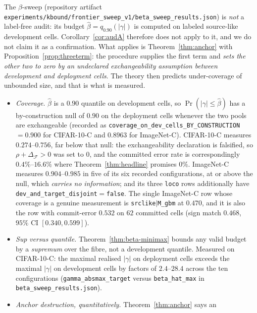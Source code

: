 \begin{remark}\label{rem:empirical}
The $\beta$-sweep (repository artifact
\texttt{experiments/kbound/frontier\_sweep\_v1/beta\_sweep\_results.json}) is \emph{not} a
label-free audit: its budget $\widehat\beta=q_{0.90}(|\gamma|)$ is computed on labeled
source-like development cells. Corollary~\ref{cor:audA} therefore does not apply to it, and
we do not claim it as a confirmation. What applies is Theorem~\ref{thm:anchor} with
Proposition~\ref{prop:threeterm}: the procedure supplies the first term and \emph{sets the
other two to zero by an undeclared exchangeability assumption between development and
deployment cells}. The theory then predicts under-coverage of unbounded size, and that is
what is measured.
\begin{itemize}
\item \emph{Coverage.} $\widehat\beta$ is a $0.90$ quantile on development cells, so
$\Pr(|\gamma|\le\widehat\beta)$ has a by-construction null of $0.90$ on the deployment cells
whenever the two pools are exchangeable (recorded as
\texttt{coverage\_on\_dev\_cells\_BY\_CONSTRUCTION} $=0.900$ for CIFAR-10-C and $0.8963$ for
ImageNet-C). CIFAR-10-C measures $0.274$--$0.756$, far below that null: the exchangeability
declaration is falsified, so $\rho+\Delta_{\mathcal F}>0$ was set to $0$, and the committed
error rate is correspondingly $0.4\%$--$16.6\%$ where Theorem~\ref{thm:headline} promises
$0\%$. ImageNet-C measures $0.904$--$0.985$ in five of its six recorded configurations, at or
above the null, which \emph{carries no information}; and its three \texttt{loco} rows
additionally have \texttt{dev\_and\_target\_disjoint}$=$\texttt{false}. The single ImageNet-C row whose
coverage is a genuine measurement is \texttt{srclike}$|$\texttt{M\_gbm} at $0.470$, and it is
also the row with commit-error $0.532$ on $62$ committed cells (sign match
$0.468$, $95\%$ CI $[0.340,0.599]$).
\item \emph{Sup versus quantile.} Theorem~\ref{thm:beta-minimax} bounds any valid budget by a
\emph{supremum} over the fibre, not a development quantile. Measured on CIFAR-10-C: the
maximal realised $|\gamma|$ on deployment cells exceeds the maximal $|\gamma|$ on development
cells by factors of $2.4$--$28.4$ across the ten configurations
(\texttt{gamma\_absmax\_target} versus \texttt{beta\_hat\_max} in
\texttt{beta\_sweep\_results.json}).
\item \emph{Anchor destruction, quantitatively.} Theorem~\ref{thm:anchor} says an

\end{itemize}
\end{remark}
